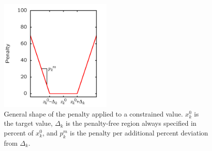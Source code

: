 \documentclass[twoside, 11pt, titlepage, captions=nooneline, a4paper, headsepline]{scrbook}%
\newcommand{\9}{\mathrm}
\newcommand{\0}{\,\mathrm}
\begin{document}
\begin{figure}
\centering
\includegraphics[width=0.5\textwidth]{Figures/PenaltyFunction.png}
\caption{General shape of the penalty applied to a constrained value. $x_k^0$ is the target value, $\Delta_k$ is the penalty-free region always specified in percent of $x_k^0$, and $p_k^m$ is the penalty per additional percent deviation from $\Delta_k$.}
\label{surfacesites}
\end{figure}
\end{document}
